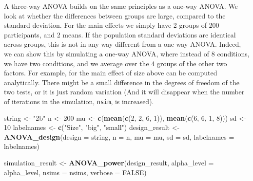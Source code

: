 \documentclass[
]{book}
\newenvironment{Shaded}{\begin{snugshade}}{\end{snugshade}}
\newcommand{\DataTypeTok}[1]{\textcolor[rgb]{0.13,0.29,0.53}{#1}}
\newcommand{\DecValTok}[1]{\textcolor[rgb]{0.00,0.00,0.81}{#1}}
\newcommand{\KeywordTok}[1]{\textcolor[rgb]{0.13,0.29,0.53}{\textbf{#1}}}
\newcommand{\NormalTok}[1]{#1}
\newcommand{\OtherTok}[1]{\textcolor[rgb]{0.56,0.35,0.01}{#1}}
\newcommand{\StringTok}[1]{\textcolor[rgb]{0.31,0.60,0.02}{#1}}
\begin{document}
A three-way ANOVA builds on the same principles as a one-way ANOVA. We look at whether the differences between groups are large, compared to the standard deviation. For the main effects we simply have 2 groups of 200 participants, and 2 means. If the population standard deviations are identical across groups, this is not in any way different from a one-way ANOVA. Indeed, we can show this by simulating a one-way ANOVA, where instead of 8 conditions, we have two conditions, and we average over the 4 groups of the other two factors. For example, for the main effect of size above can be computed analytically. There might be a small difference in the degrees of freedom of the two tests, or it is just random variation (And it will disappear when the number of iterations in the simulation, \texttt{nsim}, is increased).

\begin{Shaded}
\begin{Highlighting}[]
\NormalTok{string <-}\StringTok{ "2b"}
\NormalTok{n <-}\StringTok{ }\DecValTok{200}
\NormalTok{mu <-}\StringTok{ }\KeywordTok{c}\NormalTok{(}\KeywordTok{mean}\NormalTok{(}\KeywordTok{c}\NormalTok{(}\DecValTok{2}\NormalTok{, }\DecValTok{2}\NormalTok{, }\DecValTok{6}\NormalTok{, }\DecValTok{1}\NormalTok{)), }\KeywordTok{mean}\NormalTok{(}\KeywordTok{c}\NormalTok{(}\DecValTok{6}\NormalTok{, }\DecValTok{6}\NormalTok{, }\DecValTok{1}\NormalTok{, }\DecValTok{8}\NormalTok{)))}
\NormalTok{sd <-}\StringTok{ }\DecValTok{10}
\NormalTok{labelnames <-}\StringTok{ }\KeywordTok{c}\NormalTok{(}\StringTok{"Size"}\NormalTok{, }\StringTok{"big"}\NormalTok{, }\StringTok{"small"}\NormalTok{)}
\NormalTok{design_result <-}\StringTok{ }\KeywordTok{ANOVA_design}\NormalTok{(}\DataTypeTok{design =}\NormalTok{ string,}
                   \DataTypeTok{n =}\NormalTok{ n, }
                   \DataTypeTok{mu =}\NormalTok{ mu, }
                   \DataTypeTok{sd =}\NormalTok{ sd, }
                   \DataTypeTok{labelnames =}\NormalTok{ labelnames)}
\end{Highlighting}
\end{Shaded}

\begin{Shaded}
\begin{Highlighting}[]
\NormalTok{simulation_result <-}\StringTok{ }\KeywordTok{ANOVA_power}\NormalTok{(design_result, }
                                 \DataTypeTok{alpha_level =}\NormalTok{ alpha_level, }
                                 \DataTypeTok{nsims =}\NormalTok{ nsims,}
                                 \DataTypeTok{verbose =} \OtherTok{FALSE}\NormalTok{)}
\end{Highlighting}
\end{Shaded}
\end{document}
